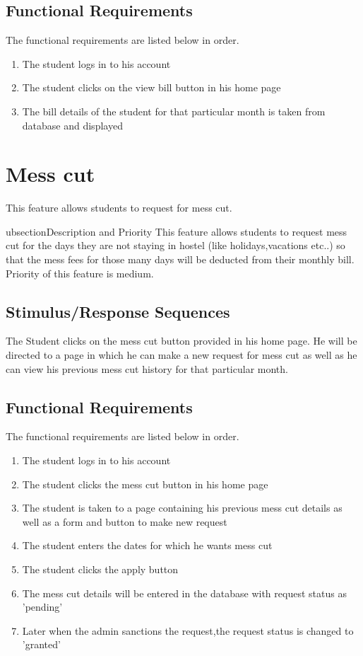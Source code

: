 \documentclass{scrreprt}
\begin{document}
\subsection{Functional Requirements}
The functional requirements are listed below in order.

\begin{enumerate}
    \item The student logs in to his account
    \item The student clicks on the view bill button in his home page
    \item The bill details of the student for that particular month is taken from database and displayed 
    
\end{enumerate} 

\section{Mess cut}
This feature allows students to request for mess cut.

\s

ubsection{Description and Priority}
This feature allows students to request mess cut for the days they are not staying in hostel (like holidays,vacations etc..) so that the mess fees for those many days will be deducted from their monthly bill. Priority of this feature is medium.

\subsection{Stimulus/Response Sequences}
The Student clicks on the mess cut button provided in his home page. He will be directed to a page in which he can make a new request for mess cut as well as he can view his previous mess cut history for that particular month.

\subsection{Functional Requirements}
The functional requirements are listed below in order.

\begin{enumerate}
    \item The student logs in to his account 
    \item The student clicks the mess cut button in his home page
    \item The student is taken to a page containing his previous mess cut details as well as a form and button to make new request 
    \item The student enters the dates for which he wants mess cut  
    \item The student clicks the apply button
    \item The mess cut details will be entered in the database with request status as 'pending'
    \item Later when the admin sanctions the request,the request status is changed to 'granted'
\end{enumerate} 
\end{document}
